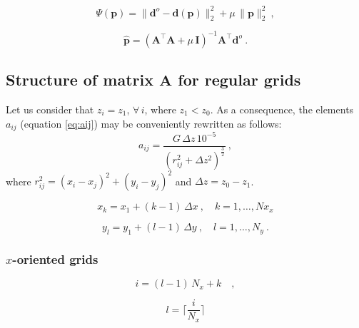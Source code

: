 \documentclass[manuscript,revised]{geophysics}
\begin{document}
\begin{equation}
\Psi(\mathbf{p}) = \| \mathbf{d}^{o} - \mathbf{d(p)} \|_{2}^{2} + 
\mu \, \| \mathbf{p} \|_{2}^{2} \: ,
\label{eq:goal-function}
\end{equation}

\begin{equation}
\hat{\mathbf{p}} = \left( \mathbf{A}^{\top}\mathbf{A} + 
\mu \, \mathbf{I} \right)^{-1}
\mathbf{A}^{\top} \mathbf{d}^{o} \: .
\label{eq:estimated-p-parameter-space}
\end{equation}


\subsection{Structure of matrix $\mathbf{A}$ for regular grids}

Let us consider that $z_{i} = z_{1}$, $\forall \, i$, where 
$z_{1} < z_{0}$. As a consequence, the elements $a_{ij}$ (equation \ref{eq:aij}) may be conveniently rewritten as follows:
\begin{equation}
a_{ij} = \frac{G \, \Delta z \, 10^{-5}}
{\left( r_{ij}^{2} + \Delta z^{2} \right)^{\frac{3}{2}}} \: ,
\label{eq:aij-regular-grids}
\end{equation}
where 
$r_{ij}^{2} = \left( x_{i} - x_{j} \right)^{2} + 
\left( y_{i} - y_{j} \right)^{2}$ and $\Delta z = z_{0} - z_{1}$. 

\begin{equation}
x_{k} = x_{1} + (k - 1) \, \Delta x \: , \quad k = 1, \dots, Nx_{x}
\label{eq:xk}
\end{equation}

\begin{equation}
y_{l} = y_{1} + (l - 1) \, \Delta y \: , \quad l = 1, \dots, N_{y} \: .
\label{eq:yl}
\end{equation}

\subsubsection{$x$-oriented grids}

\begin{equation}
i = (l - 1) \, N_{x} + k \quad ,
\label{eq:i-x-oriented}
\end{equation}

\begin{equation}
l = \Bigg\lceil \frac{i}{N_{x}} \Bigg\rceil
\label{eq:l-x-oriented}
\end{equation}
\end{document}
